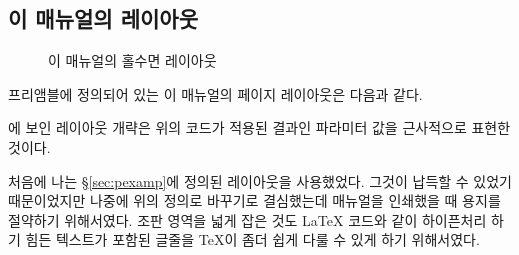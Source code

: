 \subsection{이 매뉴얼의 레이아웃}

\begin{figure}
\currentstock
\oddpagelayouttrue
\twocolumnlayoutfalse
\drawmarginparstrue
\drawparametersfalse
\drawstock
\caption{이 매뉴얼의 홀수면 레이아웃}
\label{fig:thispagelay}
\end{figure}



프리앰블에 정의되어 있는 이 매뉴얼의
페이지 레이아웃은 다음과 같다.
\begin{lcode}
\settrimmedsize{11in}{210mm}{*}
\setlength{\trimtop}{0pt}
\setlength{\trimedge}{\stockwidth}
\addtolength{\trimedge}{-\paperwidth}
\settypeblocksize{7.75in}{33pc}{*}
\setulmargins{4cm}{*}{*}
\setlrmargins{1.25in}{*}{*}
\setmarginnotes{17pt}{51pt}{\onelineskip}
\setheadfoot{\onelineskip}{2\onelineskip}
\setheaderspaces{*}{2\onelineskip}{*}
\checkandfixthelayout
\end{lcode}

에 보인 레이아웃 개략은 위의 코드가 적용된
결과인 파라미터 값을 근사적으로 표현한 것이다.

처음에 나는 \S\ref{sec:pexamp}에 정의된 레이아웃을 사용했었다.
그것이 납득할 수 있었기 때문이었지만 나중에 위의 정의로 바꾸기로 결심했는데
매뉴얼을 인쇄했을 때 용지를 절약하기 위해서였다.
조판 영역을 넓게 잡은 것도 LaTeX 코드와 같이 하이픈처리 하기 힘든 텍스트가
포함된 글줄을 TeX이 좀더 쉽게 다룰 수 있게 하기 위해서였다.

